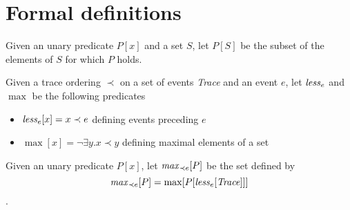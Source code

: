 \documentclass{article}
\newcommand{\less}{{\it less}\xspace}
\newcommand{\eMax}[1]{{\it max}_{#1}}
\begin{document}



\appendix
\section{Formal definitions}
Given an unary predicate $P[x]$ and a set $S$, let $P[S]$ be the subset of
the elements of $S$ for which $P$ holds.

Given a trace ordering $\prec$ on a set of events {\it Trace} and an event $e$, let $\less_e$ and $\max$ be
the following predicates
\begin{itemize}
\item $\less_e[x] = x \prec e$ defining events preceding $e$
\item $\max[x] = \neg\exists y. x \prec y$ defining maximal elements of a set
\end{itemize}

Given an unary predicate $P[x]$, let $\eMax{\prec e}[P]$ be the set
defined by
$$\eMax{\prec e}[P] = \max[P[\less_e[{\it Trace}]]]$$.
\end{document}
